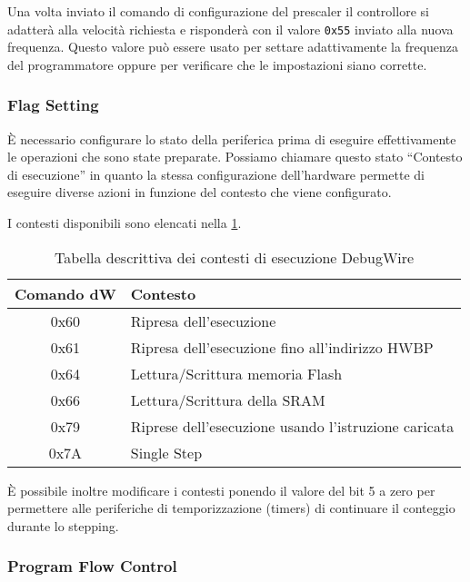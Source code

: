 Una volta inviato il comando di configurazione del prescaler il controllore si adatterà alla velocità richiesta e risponderà con il valore \texttt{0x55} inviato alla nuova frequenza. Questo valore può essere usato per settare adattivamente la frequenza del programmatore oppure per verificare che le impostazioni siano corrette.

\subsubsection{Flag Setting}

È necessario configurare lo stato della periferica prima di eseguire effettivamente le operazioni che sono state preparate. Possiamo chiamare questo stato ``Contesto di esecuzione'' in quanto la stessa configurazione dell'hardware permette di eseguire diverse azioni in funzione del contesto che viene configurato.

I contesti disponibili sono elencati nella \cref{tab:dw-contexts}.

\begin{table}[ht]
    \centering
    \begin{tabular}{ c l }
        \textbf{Comando dW} & \textbf{Contesto} \\
        \hline
        0x60 & Ripresa dell'esecuzione\\
        0x61 & Ripresa dell'esecuzione fino all'indirizzo HWBP\\
        0x64 & Lettura/Scrittura memoria Flash\\
        0x66 & Lettura/Scrittura della SRAM\\
        0x79 & Riprese dell'esecuzione usando l'istruzione caricata\\
        0x7A & Single Step\\
        \hline
    \end{tabular}
    \caption[]{Tabella descrittiva dei contesti di esecuzione DebugWire\cite{site:dw-reverse-engeneering}}\label{tab:dw-contexts}
\end{table}

È possibile inoltre modificare i contesti ponendo il valore del bit 5 a zero per permettere alle periferiche di temporizzazione (timers) di continuare il conteggio durante lo stepping.

\subsubsection{Program Flow Control}

